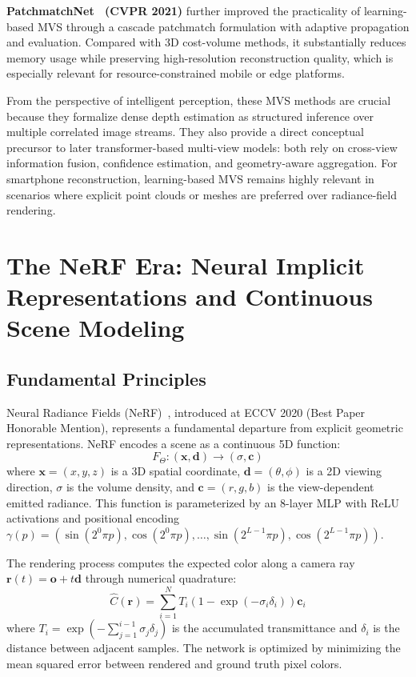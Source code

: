 \documentclass[journal]{IEEEtran}
\begin{document}
\textbf{PatchmatchNet~\cite{patchmatchnet} (CVPR 2021)} further improved the practicality of learning-based MVS through a cascade patchmatch formulation with adaptive propagation and evaluation. Compared with 3D cost-volume methods, it substantially reduces memory usage while preserving high-resolution reconstruction quality, which is especially relevant for resource-constrained mobile or edge platforms.

From the perspective of intelligent perception, these MVS methods are crucial because they formalize dense depth estimation as structured inference over multiple correlated image streams. They also provide a direct conceptual precursor to later transformer-based multi-view models: both rely on cross-view information fusion, confidence estimation, and geometry-aware aggregation. For smartphone reconstruction, learning-based MVS remains highly relevant in scenarios where explicit point clouds or meshes are preferred over radiance-field rendering.

\section{The NeRF Era: Neural Implicit Representations and Continuous Scene Modeling}
\label{sec:nerf}

\subsection{Fundamental Principles}

Neural Radiance Fields (NeRF)~\cite{nerf}, introduced at ECCV 2020 (Best Paper Honorable Mention), represents a fundamental departure from explicit geometric representations. NeRF encodes a scene as a continuous 5D function:
\begin{equation}
F_{\Theta}: (\mathbf{x}, \mathbf{d}) \rightarrow (\sigma, \mathbf{c})
\end{equation}
where $\mathbf{x} = (x,y,z)$ is a 3D spatial coordinate, $\mathbf{d} = (\theta, \phi)$ is a 2D viewing direction, $\sigma$ is the volume density, and $\mathbf{c} = (r,g,b)$ is the view-dependent emitted radiance. This function is parameterized by an 8-layer MLP with ReLU activations and positional encoding $\gamma(p) = (\sin(2^0\pi p), \cos(2^0\pi p), \dots, \sin(2^{L-1}\pi p), \cos(2^{L-1}\pi p))$.

The rendering process computes the expected color along a camera ray $\mathbf{r}(t) = \mathbf{o} + t\mathbf{d}$ through numerical quadrature:
\begin{equation}
\hat{C}(\mathbf{r}) = \sum_{i=1}^N T_i (1 - \exp(-\sigma_i\delta_i)) \mathbf{c}_i
\end{equation}
where $T_i = \exp(-\sum_{j=1}^{i-1} \sigma_j\delta_j)$ is the accumulated transmittance and $\delta_i$ is the distance between adjacent samples. The network is optimized by minimizing the mean squared error between rendered and ground truth pixel colors.
\end{document}

